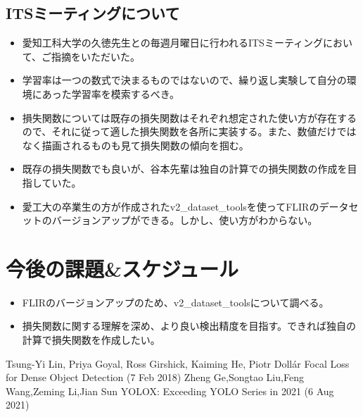 \documentclass[a4j]{jarticle}
\begin{document}
	\subsection{ITSミーティングについて}
	\begin{itemize}
		\item 愛知工科大学の久徳先生との毎週月曜日に行われるITSミーティングにおいて、ご指摘をいただいた。
		\item 学習率は一つの数式で決まるものではないので、繰り返し実験して自分の環境にあった学習率を模索するべき。
		\item 損失関数については既存の損失関数はそれぞれ想定された使い方が存在するので、それに従って適した損失関数を各所に実装する。また、数値だけではなく描画されるものも見て損失関数の傾向を掴む。
		\item 既存の損失関数でも良いが、谷本先輩は独自の計算での損失関数の作成を目指していた。
		\item 愛工大の卒業生の方が作成されたv2\_dataset\_toolsを使ってFLIRのデータセットのバージョンアップができる。しかし、使い方がわからない。
	\end{itemize}
	\section{今後の課題\&スケジュール}
		\begin{itemize}
			\item FLIRのバージョンアップのため、v2\_dataset\_toolsについて調べる。
			\item 損失関数に関する理解を深め、より良い検出精度を目指す。できれば独自の計算で損失関数を作成したい。
		\end{itemize}

\begin{thebibliography}{10}
	Tsung-Yi Lin, Priya Goyal, Ross Girshick, Kaiming He, Piotr Dollár Focal Loss for Dense Object Detection (7 Feb 2018)
	Zheng Ge,Songtao Liu,Feng Wang,Zeming Li,Jian Sun YOLOX: Exceeding YOLO Series in 2021 (6 Aug 2021)
\end{thebibliography}
\end{document}
